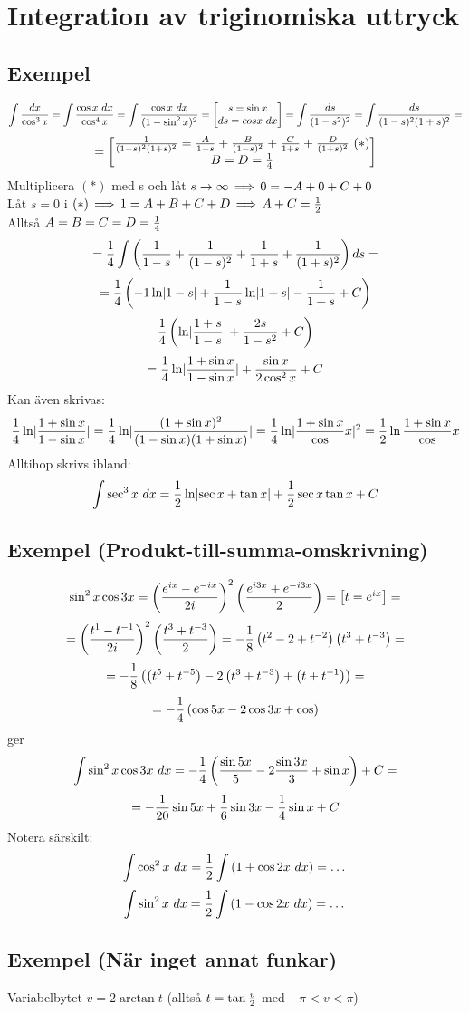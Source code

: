\documentclass{article}
\begin{document}
\section{Integration av triginomiska uttryck}
\subsection{Exempel}
$$ \int{dx \over \cos^3 x} = \int{\cos x\ dx \over \cos^4 x} = \int{\cos x\ dx \over (1-\sin^2 x)^2}
= \bmat{s=\sin x \\ ds = cos x\ dx} = \int{ds \over (1-s^2)^2} = \int{\f{ds}{(1-s)^2(1+s)^2}}  =$$
$$ =\left[\begin{matrix}\frac{1}{(1-s)^2(1+s)^2} = \frac{A}{1-s}+\frac{B}{(1-s)^2} + \frac{C}{1+s} + \frac{D}{(1+s)^2}\ (*) \\
B=D=\frac{1}{4}\end{matrix}\right] $$
Multiplicera $(*)$ med s och låt $s\to\infty \operatorname{\implies} 0 = -A+0+C+0$\\
Låt $s=0$ i $(*) \operatorname{\implies} 1 = A+B+C+D \operatorname{\implies} A+C=\frac{1}{2}$\\
Alltså $A=B=C=D=\frac{1}{4}$
$$ = \frac{1}{4} \int{\left(\frac{1}{1-s} + \frac{1}{(1-s)^2} + \frac{1}{1+s} + \frac{1}{(1+s)^2} \right) ds } =$$
$$ = \frac{1}{4} \left(-1\ln\lvert1-s\rvert + \frac{1}{1-s} \ln\lvert1+s\rvert - \frac{1}{1+s} +C \right) $$
$$ \frac{1}{4}\left(\ln\lvert\frac{1+s}{1-s}\rvert + \frac{2s}{1-s^2} + C\right) $$
$$ = \frac{1}{4} \ln\lvert\frac{1+\sin x}{1-\sin x}\rvert + \frac{\sin x}{2\cos^2 x}+ C $$
Kan även skrivas:
$$\frac{1}{4} \ln\lvert\frac{1+\sin x}{1-\sin x}\rvert = \frac{1}{4} \ln \lvert\frac{(1+\sin x)^2}{ (1-\sin x) (1+\sin x)}\rvert = \frac{1}{4}\ln\lvert\frac{1+\sin x}{\cos} x\rvert^2 = \frac{1}{2}\ln{\frac{1+\sin x}{\cos} x}$$
Alltihop skrivs ibland:
$$ \int{\sec^3 x\ dx} = \frac{1}{2}\ln\lvert\sec x + \tan x\rvert  + \frac{1}{2}\sec x\tan x + C$$

\subsection{Exempel (Produkt-till-summa-omskrivning)}
$$ \sin^2 x \cos 3x = \left(\frac{e^{ix} - e^{-ix} }{2i} \right)^2 \left(\frac{e^{i3x} + e^{-i3x}}{2}\right) =\left[\begin{matrix}t=e^{ix}\end{matrix}\right] =$$
$$ =\left(\frac{t^1-t^{-1}}{2i}\right)^2 \left(\frac{t^3 + t^{-3}}{2}\right) = -\frac{1}{8}\left(t^2-2+t^{-2}\right)\left(t^3+t^{-3}\right) =$$
$$=-\frac{1}{8}\left(\left(t^5+t^{-5}\right)-2\left(t^3+t^{-3}\right) + \left(t+t^{-1}\right)\right) =$$
$$= -\frac{1}{4}\left(\cos 5x - 2\cos 3x + \cos\right) $$
ger
$$ \int{\sin^2 x\cos 3x\ dx} = -\frac{1}{4}\left(\frac{\sin 5x}{5} - 2 \frac{\sin 3x}{3} +\sin x\right)+C =$$
$$ = -\frac{1}{20} \sin 5x + \frac{1}{6} \sin 3x - \frac{1}{4}\sin x +C $$
Notera särskilt:
$$ \int{\cos^2 x\ dx} = \frac{1}{2} \int{\left(1+\cos 2x\ dx\right)} = \dots$$
$$ \int{\sin^2 x\ dx} = \f12 \int{\pa{1-\cos 2x\ dx}} = \dots$$

\subsection{Exempel (När inget annat funkar)}
Variabelbytet $v=2\arctan t$ (alltså $t=\tan\frac{v}{2}$ med $-\pi < v<\pi$)
\end{document}
